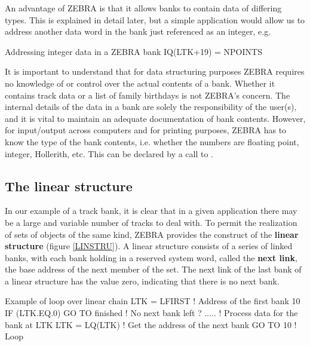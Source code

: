 An advantage of ZEBRA is that it allows banks to contain data of
differing types. This is explained in detail later, but a simple
application would allow us to address another data word in the bank just
referenced as an integer, e.g.
\begin{XMPt}{Addressing integer data in a ZEBRA bank}
      IQ(LTK+19) = NPOINTS
\end{XMPt}
It is important to understand that for data structuring purposes
ZEBRA requires no knowledge of or control
over the actual contents of a bank. 
Whether it contains track data or a
list of family birthdays is not ZEBRA's concern. 
The internal details of
the data in a bank are solely the responsibility of the user(s), and it is
vital to maintain an adequate documentation of bank contents.
However, for input/output across computers and for printing
purposes, ZEBRA has to know the type of the bank contents, i.e. whether
the numbers are floating point, integer, Hollerith, etc.
This can be declared by a call to .

\subsection{The linear structure}

In our example of a track bank, it is clear that in a given application
there may be a large and variable number of tracks to deal with.
To permit the realization of sets of objects of the same kind, ZEBRA
provides the construct of the {\bf linear structure} (figure \ref{LINSTRU}).
A linear structure consists of a series of linked banks, with each bank
holding in a reserved system word, called the {\bf next link},
the base address of the next member of the set. The next link of the
last bank of a linear structure has the value zero, indicating that
there is no next bank.

\begin{minipage}{\textwidth}

\begin{Fighere}
\begin{center}
\mbox{}
\end{center}
\caption{A simple linear structure}
\label{LINSTRU}
\end{Fighere}

\vspace*{-2mm}

\begin{XMPt}{Example of loop over linear chain}
      LTK = LFIRST                      ! Address of the first bank
   10 IF (LTK.EQ.0) GO TO finished      ! No next bank left ?
            .....                       ! Process data for the bank at LTK
          LTK = LQ(LTK)                 ! Get the address of the next bank
      GO TO 10                          ! Loop
\end{XMPt}
\end{minipage}

